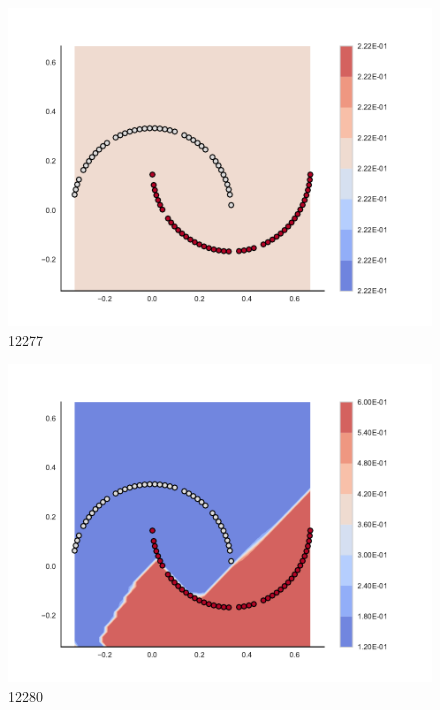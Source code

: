 \begin{subfigure}[b]{0.09\textwidth}
    \includegraphics[clip, trim=2.35cm 1.75cm 4.5cm 0cm,width=\textwidth]{img/convergence/12277.pdf}
    \caption{12277}
    \label{fig:convergence_12277}
\end{subfigure}
%
\begin{subfigure}[b]{0.09\textwidth}
    \includegraphics[clip, trim=2.35cm 1.75cm 4.5cm 0cm,width=\textwidth]{img/convergence/12280.pdf}
    \caption{12280}
    \label{fig:convergence_12280}
\end{subfigure}
%
